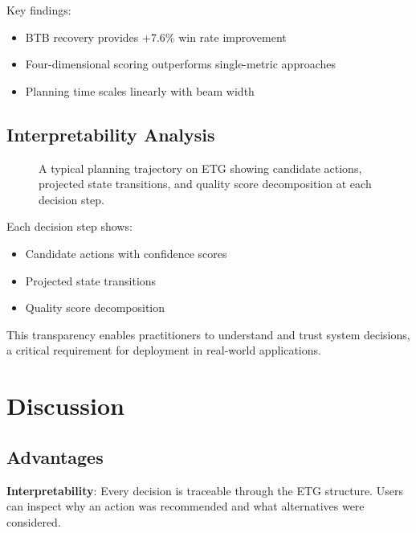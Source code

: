 \documentclass[letterpaper]{article}
\begin{document}
Key findings:
\begin{itemize}
    \item BTB recovery provides +7.6\% win rate improvement
    \item Four-dimensional scoring outperforms single-metric approaches
    \item Planning time scales linearly with beam width
\end{itemize}

\subsection{Interpretability Analysis}

\begin{figure}[t]
\centering
{}
\caption{A typical planning trajectory on ETG showing candidate actions, projected state transitions, and quality score decomposition at each decision step.}
\label{fig:path}
\end{figure}

Each decision step shows:
\begin{itemize}
    \item Candidate actions with confidence scores
    \item Projected state transitions
    \item Quality score decomposition
\end{itemize}

This transparency enables practitioners to understand and trust system decisions, a critical requirement for deployment in real-world applications.

\section{Discussion}

\subsection{Advantages}

\textbf{Interpretability}: Every decision is traceable through the ETG structure. Users can inspect why an action was recommended and what alternatives were considered.
\end{document}
